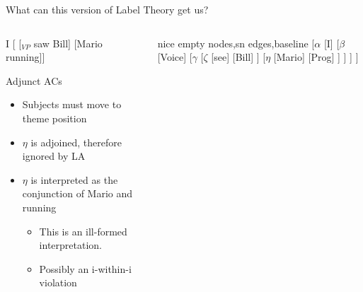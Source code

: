 \documentclass[proposal]{subfiles}
\begin{document}
\begin{frame}
  {What can this version of Label Theory get us?}
  \begin{columns}
    \begin{column}[T]{0.55\textwidth}
      {\rm *I [ [$_{VP}$ saw Bill] [Mario running]]}
      \begin{block}
	{Adjunct ACs}
	\begin{itemize}
	  \item Subjects must move to theme position
	  \item $\eta$ is adjoined, therefore ignored by LA
	  \item $\eta$ is interpreted as the conjunction of {\rm Mario} and {\rm running}
	    \begin{itemize}
	      \item This is an ill-formed interpretation.
	      \item Possibly an i-within-i violation \parencite{vergnaud1974french}
	    \end{itemize}
	\end{itemize}
      \end{block}
    \end{column}
    \begin{column}[T]{0.45\textwidth}
      {\small
	  \begin{forest}
	    nice empty nodes,sn edges,baseline
	    [$\alpha$
	      [{\rm I}]
	      [$\beta$
		[Voice]
		[$\gamma$
		  [$\zeta$
		    [{\rm see}]
		    [{\rm Bill}]
		  ]
		  [$\eta$
		    [{\rm Mario}]
		    [Prog]
		  ]
		]
	      ]
	    ]
	  \end{forest}
	}
    \end{column}
  \end{columns}
\end{frame}
\end{document}
